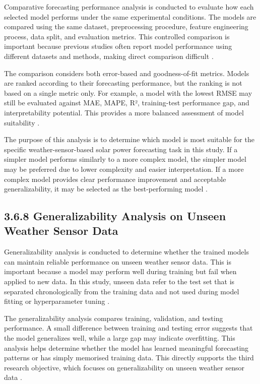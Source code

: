 Comparative forecasting performance analysis is conducted to evaluate how each selected model performs under the same experimental conditions. The models are compared using the same dataset, preprocessing procedure, feature engineering process, data split, and evaluation metrics. This controlled comparison is important because previous studies often report model performance using different datasets and methods, making direct comparison difficult \parencite{JnanaVarshitha2025, ArellanosTafur2025, Alhassan2025}.

The comparison considers both error-based and goodness-of-fit metrics. Models are ranked according to their forecasting performance, but the ranking is not based on a single metric only. For example, a model with the lowest RMSE may still be evaluated against MAE, MAPE, R², training-test performance gap, and interpretability potential. This provides a more balanced assessment of model suitability \parencite{Bakht2025, CarvalhoJunior2025, TsaiLo2025}.

The purpose of this analysis is to determine which model is most suitable for the specific weather-sensor-based solar power forecasting task in this study. If a simpler model performs similarly to a more complex model, the simpler model may be preferred due to lower complexity and easier interpretation. If a more complex model provides clear performance improvement and acceptable generalizability, it may be selected as the best-performing model \parencite{Eren2025, Duvuru2026, Ma2025}.

\subsection{3.6.8 Generalizability Analysis on Unseen Weather Sensor Data}

Generalizability analysis is conducted to determine whether the trained models can maintain reliable performance on unseen weather sensor data. This is important because a model may perform well during training but fail when applied to new data. In this study, unseen data refer to the test set that is separated chronologically from the training data and not used during model fitting or hyperparameter tuning \parencite{Eren2025, ArellanosTafur2025, Ma2025}.

The generalizability analysis compares training, validation, and testing performance. A small difference between training and testing error suggests that the model generalizes well, while a large gap may indicate overfitting. This analysis helps determine whether the model has learned meaningful forecasting patterns or has simply memorised training data. This directly supports the third research objective, which focuses on generalizability on unseen weather sensor data \parencite{JnanaVarshitha2025, CarvalhoJunior2025, Duvuru2026}.

